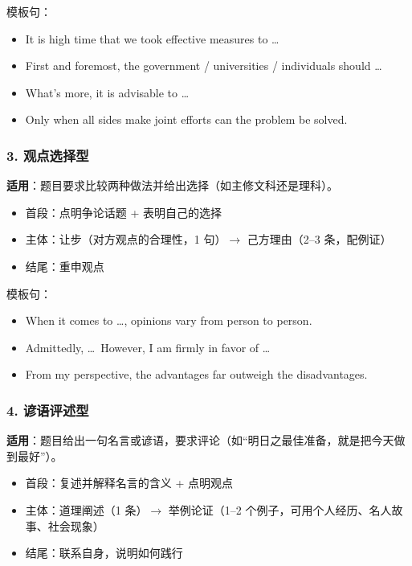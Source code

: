 模板句：
\begin{itemize}
  \item It is high time that we took effective measures to \ldots
  \item First and foremost, the government / universities / individuals should \ldots
  \item What's more, it is advisable to \ldots
  \item Only when all sides make joint efforts can the problem be solved.
\end{itemize}

\subsubsection*{3. 观点选择型}

\textbf{适用}：题目要求比较两种做法并给出选择（如主修文科还是理科）。

\begin{itemize}
  \item 首段：点明争论话题 + 表明自己的选择
  \item 主体：让步（对方观点的合理性，1 句）$\to$ 己方理由（2--3 条，配例证）
  \item 结尾：重申观点
\end{itemize}

模板句：
\begin{itemize}
  \item When it comes to \ldots, opinions vary from person to person.
  \item Admittedly, \ldots\ However, I am firmly in favor of \ldots
  \item From my perspective, the advantages far outweigh the disadvantages.
\end{itemize}

\subsubsection*{4. 谚语评述型}

\textbf{适用}：题目给出一句名言或谚语，要求评论（如“明日之最佳准备，就是把今天做到最好”）。

\begin{itemize}
  \item 首段：复述并解释名言的含义 + 点明观点
  \item 主体：道理阐述（1 条）$\to$ 举例论证（1--2 个例子，可用个人经历、名人故事、社会现象）
  \item 结尾：联系自身，说明如何践行
\end{itemize}

